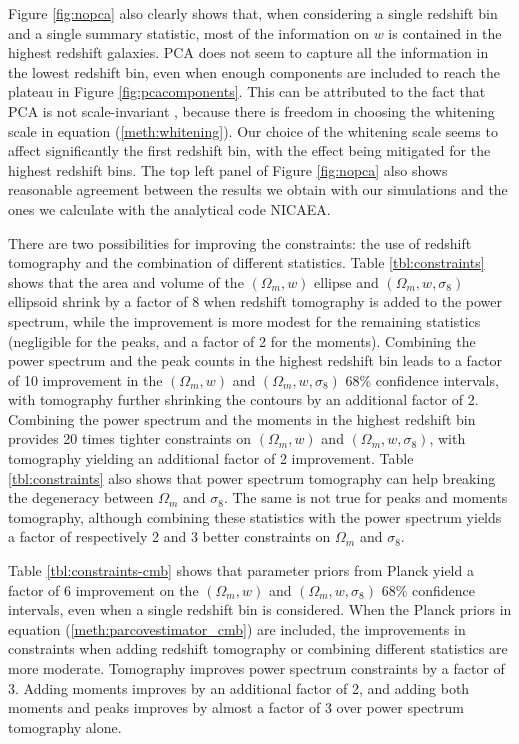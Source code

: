 \documentclass[reprint,aps,prd,superscriptaddress,showkeys,showpacs]{revtex4-1}
\begin{document}
Figure \ref{fig:nopca} also clearly shows that, when considering a single redshift bin and a single summary statistic, most of the information on $w$ is contained in the highest redshift galaxies. PCA does not seem to capture all the information in the lowest redshift bin, even when enough components are included to reach the plateau in Figure \ref{fig:pcacomponents}. This can be attributed to the fact that PCA is not scale-invariant \citep{astroMLText}, because there is freedom in choosing the whitening scale in equation (\ref{meth:whitening}). Our choice of the whitening scale seems to affect significantly the first redshift bin, with the effect being mitigated for the highest redshift bins. 
The top left panel of Figure \ref{fig:nopca} also shows reasonable agreement between the results we obtain with our simulations and the ones we calculate with the analytical code NICAEA. 

There are two possibilities for improving the constraints: the use of redshift tomography and the combination of different statistics. Table \ref{tbl:constraints} shows that the area and volume of the $(\Omega_m,w)$ ellipse and $(\Omega_m,w,\sigma_8)$ ellipsoid shrink by a factor of 8 when redshift tomography is added to the power spectrum, while the improvement is more modest for the remaining statistics (negligible for the peaks, and a factor of 2 for the moments). Combining the power spectrum and the peak counts in the highest redshift bin leads to a factor of 10 improvement in the $(\Omega_m,w)$ and $(\Omega_m,w,\sigma_8)$ 68\% confidence intervals, with tomography further shrinking the contours by an additional factor of 2. Combining the power spectrum and the moments in the highest redshift bin provides 20 times tighter constraints on $(\Omega_m,w)$ and $(\Omega_m,w,\sigma_8)$, with tomography yielding an additional factor of 2 improvement. Table \ref{tbl:constraints} also shows that power spectrum tomography can help breaking the degeneracy between $\Omega_m$ and $\sigma_8$. The same is not true for peaks and moments tomography, although combining these statistics with the power spectrum yields a factor of respectively 2 and 3 better constraints on $\Omega_m$ and $\sigma_8$. 

Table \ref{tbl:constraints-cmb} shows that parameter priors from Planck yield a factor of 6 improvement on the $(\Omega_m,w)$ and $(\Omega_m,w,\sigma_8)$ 68\% confidence intervals, even when a single redshift bin is considered. When the Planck priors in equation (\ref{meth:parcovestimator_cmb}) are included, the improvements in constraints when adding redshift tomography or combining different statistics are more moderate. Tomography improves power spectrum constraints by a factor of 3. Adding moments improves by an additional factor of 2, and  adding both moments and peaks improves by almost a factor of 3 over power spectrum tomography alone. 
\end{document}
